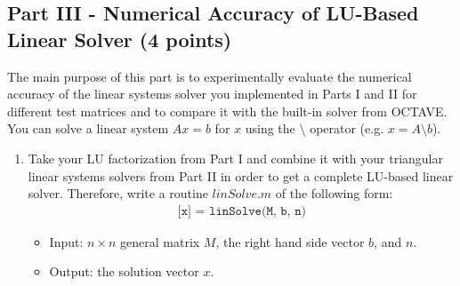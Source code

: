 \documentclass{scrartcl}
\begin{document}
    \subsection*{Part III - Numerical Accuracy of LU-Based Linear Solver (4 points)}
    The main purpose of this part is to experimentally evaluate the numerical accuracy of the linear systems solver you implemented in Parts I and II for different test matrices and to compare it with the built-in solver from OCTAVE. 
    You can solve a linear system $Ax=b$ for $x$ using the $\setminus$ operator (e.g. $x = A \setminus b$).
 
    \begin{enumerate}
        \item Take your LU factorization from Part I and combine it with your triangular linear systems solvers from Part II in order to get a complete LU-based linear solver. Therefore, write a routine $linSolve.m$ of the following form: 
			\begin{align*}
				\texttt{[x] = linSolve(M, b, n)}
			\end{align*}
			\begin{itemize}
				\item Input: $n \times n$ general matrix $M$, the right hand side vector $b$, and $n$.
            	\item Output: the solution vector $x$.        	
        	\end{itemize}


\end{enumerate}
\end{document}
